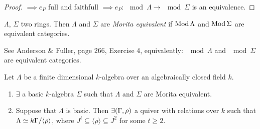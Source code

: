 \begin{prop}
\begin{proof}
$\implies e_P$ full and faithfull $\implies e_P\colon \mod\Lambda \to \mod\Sigma$ is an equivalence.
\end{proof}
\end{prop}

\begin{defin}
$\Lambda$, $\Sigma$ two rings. Then $\Lambda$ and $\Sigma$ are
\emph{Morita equivalent} if $\operatorname{Mod}\Lambda$ and $\operatorname{Mod}\Sigma$ are
equivalent categories.
\end{defin}
\begin{note}
  See Anderson \& Fuller, page 266, Exercise 4, equivalently:
  $\mod\Lambda$ and $\mod\Sigma$ are equivalent categories.
\end{note}

\begin{thm}
Let $\Lambda$ be a finite dimensional $k$-algebra over an algebraically closed field $k$.
\begin{enumerate}[\rm(a)]
\item $\exists$ a basic $k$-algebra $\Sigma$ such that $\Lambda$ and $\Sigma$ are Morita equivalent.
\item Suppose that $\Lambda$ is basic. Then $\exists (\Gamma, \rho)$ a quiver with relations over $k$ such that $\Lambda \simeq k\Gamma/\langle \rho \rangle$, where $J^t \subseteq \langle \rho \rangle \subseteq J^2$ for some $t \geq 2$.
\end{enumerate}
\end{thm}
